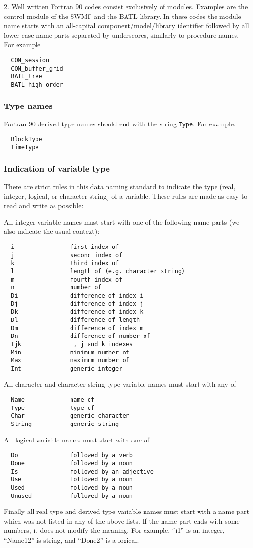 \documentclass{article}
\begin{document}
2. Well written Fortran 90 codes consist exclusively of modules.
Examples are the control module of the SWMF and the BATL library.
In these codes the module name starts with an all-capital
component/model/library identifier followed by all lower case
name parts separated by underscores, similarly to procedure names.
For example
\begin{verbatim}
  CON_session
  CON_buffer_grid
  BATL_tree
  BATL_high_order
\end{verbatim}

\subsubsection{Type names}

Fortran 90 derived type names should end with the string {\tt Type}.
For example:
\begin{verbatim}
  BlockType
  TimeType
\end{verbatim}

\subsubsection{Indication of variable type}

There are strict rules in this data naming standard to indicate 
the type (real, integer, logical, or character string) of 
a variable. These rules are made as easy to read and write
as possible:

All integer variable names must start with one of the following name parts
(we also indicate the usual context):
\begin{verbatim}
  i                first index of
  j                second index of
  k                third index of
  l                length of (e.g. character string)
  m                fourth index of
  n                number of
  Di               difference of index i
  Dj               difference of index j
  Dk               difference of index k
  Dl               difference of length
  Dm               difference of index m
  Dn               difference of number of
  Ijk              i, j and k indexes
  Min              minimum number of
  Max              maximum number of
  Int              generic integer
\end{verbatim}
All character and character string type variable names must start with
any of 
\begin{verbatim}
  Name             name of
  Type             type of
  Char             generic character
  String           generic string
\end{verbatim}
All logical variable names must start with one of
\begin{verbatim}
  Do               followed by a verb
  Done             followed by a noun
  Is               followed by an adjective
  Use              followed by a noun
  Used             followed by a noun
  Unused           followed by a noun
\end{verbatim}
Finally all real type and derived type variable names must start with a 
name part which was not listed in any of the above lists. If the name
part ends with some numbers, it does not modify the meaning. For example,
``i1'' is an integer, ``Name12'' is string, and ``Done2'' is a logical.
\end{document}

